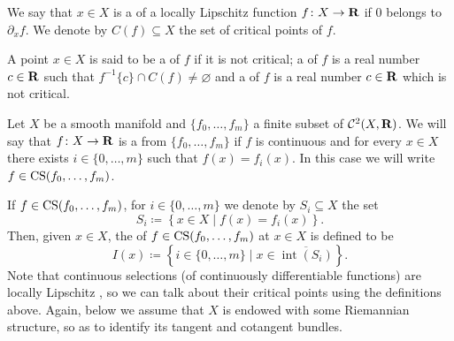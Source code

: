 \begin{definition}
\label{E!D:critical}
  We say that $x \in X$ is a  of a locally Lipschitz function $f \colon X \to \mathbf{R}$ if $0$ belongs to $\partial_x f$. We denote by $C(f) \subseteq X$ the set of critical points of $f$.
  
  A point $x\in X$ is said to be a  of $f$ if it is not critical; a  of $f$ is a real number $c \in \mathbf{R}$ such that $f^{-1}\{c\} \cap C(f) \neq \varnothing$ and a  of $f$ is a real number $c \in \mathbf{R}$ which is not critical.
\end{definition}

\begin{definition}
\label{E!D:continuous-selection}
  Let $X$ be a smooth manifold and $\{f_0, \ldots, f_m\}$ a finite subset of $\mathcal{C}^2(X, \mathbf{R})$. We will say that $f \colon X \to \mathbf{R}$ is a  from $\{f_0, \ldots, f_m\}$ if $f$ is continuous and for every $x \in X$ there exists $i \in \{0, \ldots, m\}$ such that $f(x) = f_i(x)$.
  In this case we will write $f\in \operatorname{CS}(f_0, \ldots, f_m)$.
\end{definition}

If $f \in \operatorname{CS}(f_0, \ldots, f_m)$, for $i \in \{0, \ldots, m\}$ we denote by $S_i \subseteq X$  the set
\[
  S_i \coloneq \left\{ x \in X \mid f(x) = f_i(x) \right\}.
\]
Then, given $x \in X$, the  of $f \in \operatorname{CS}(f_0, \ldots, f_m)$ at $x \in X$ is defined to be
\[
  I(x) \coloneq \left\{ i \in \{0, \ldots, m\} \mid x \in \overline{\operatorname{int}(S_i)} \right\}.
\]
Note that continuous selections (of continuously differentiable functions) are locally Lipschitz \cite{JongenPallaschke1988}, so we can talk about their critical points using the definitions above. Again, below we assume that $X$ is endowed with some Riemannian structure, so as to identify its tangent and cotangent bundles.

